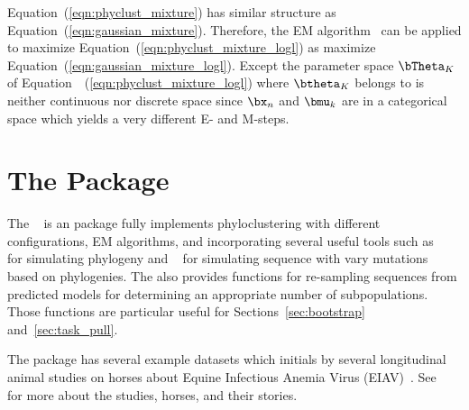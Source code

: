 \begin{enumerate}
\end{enumerate}

Equation~(\ref{eqn:phyclust_mixture}) has similar structure
as Equation~(\ref{eqn:gaussian_mixture}). Therefore, the
EM algorithm~\citep{Dempster1977}
can be applied to maximize Equation~(\ref{eqn:phyclust_mixture_logl})
as maximize Equation~(\ref{eqn:gaussian_mixture_logl}).
Except the parameter space $\bTheta_K$ of
Equation~~(\ref{eqn:phyclust_mixture_logl}) where $\btheta_K$ belongs to
is neither continuous nor discrete space since $\bx_n$ and $\bmu_k$ are
in a categorical space which yields a very different E- and M-steps.


\section{The  Package}
\label{sec:phyclust}

The ~\citep{Chen2011a}
is an  package fully implements
phyloclustering with different configurations, EM algorithms, and
incorporating several useful tools such as ~\citep{Hudson2002}
for simulating phylogeny and ~\citep{Rambaut1997}
for simulating sequence with vary mutations based on phylogenies.
The  also provides functions for re-sampling sequences from
predicted models for determining an appropriate number of subpopulations.
Those functions are particular useful for Sections~\ref{sec:bootstrap}
and~\ref{sec:task_pull}.

The  package has several example datasets which initials by
several longitudinal animal studies on horses about Equine Infectious Anemia
Virus (EIAV)~\citep{Leroux2004}.
See~\citet{Baccam2003} for more about the studies, horses, and their stories.

